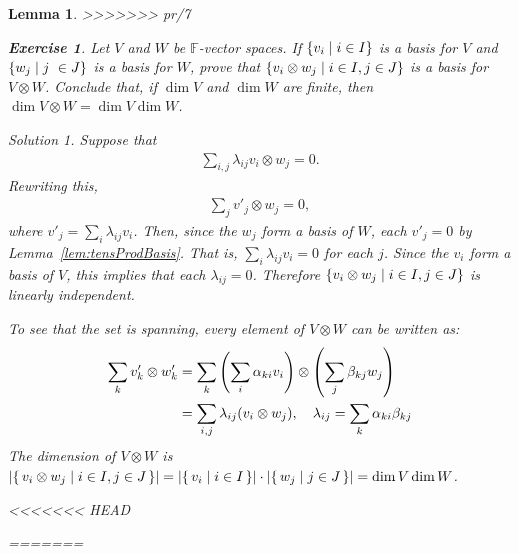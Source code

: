 \documentclass{article}
\newtheorem{Lemma}{Lemma}
\theoremstyle{definition}
\newtheorem{Exercise}{Exercise}
\theoremstyle{remark}
\newtheorem*{Solution*}{Solution}
\theoremstyle{underline}
\theoremstyle{underline}
\begin{document}
\begin{Lemma}
>>>>>>> pr/7
	\begin{Exercise}
		Let $V$ and $W$ be $\mathbb{F}$-vector spaces. If $\qty{v_i \mid i \in I}$ is a basis for $V$ and $\qty{w_j \mid j \
		\in J}$ is a basis for $W$, prove that $\qty{v_i \otimes w_j \mid i \in I, j \in J}$ is a basis for $V \otimes W$. Conclude that, if $\dim V$ and $\dim W$ are finite, then $\dim V \otimes W = \dim V \dim W$.
	\end{Exercise}
	\begin{Solution*}
		Suppose that
		\begin{gather*}
			\sum_{i,j} \lambda_{ij} v_i \otimes w_j = 0.
		\end{gather*}
		Rewriting this,
		\begin{gather*}
			\sum_j v'_j \otimes w_j = 0,
		\end{gather*}
		where $v'_j = \sum_i \lambda_{ij} v_i$. Then, since the $w_j$ form a basis of $W$, each $v'_j = 0$ by Lemma~\ref{lem:tensProdBasis}. That is, $\sum\limits_i \lambda_{ij} v_i = 0$ for each $j$. Since the $v_i$ form a basis of $V$, this implies that each $\lambda_{ij} = 0$. Therefore $\qty{v_i \otimes w_j \mid i \in I, j \in J}$ is linearly independent.
		
		To see that the set is spanning, every element of $V \otimes W$ can be written as:
		\begin{align*}
			\sum_{k} v'_k \otimes w'_k & = \sum_k \pqty{\sum_i \alpha_{ki} v_i} \otimes \pqty{\sum_j \beta_{kj} w_j} \\
				& = \sum_{i,j} \lambda_{ij} \pqty{v_i \otimes w_j}, \quad \lambda_{ij} = \sum_k \alpha_{ki} \beta_{kj}
		\end{align*}
		The dimension of $V \otimes W$ is $\abs{\qty{\, v_i \otimes w_j \mid i \in I, j \in J \,}} = \abs{\qty{\, v_i \mid i \in I \,} } \cdot \abs{\qty{\, w_j \mid j \in J \,}} = \dim V \dim W$.
	\end{Solution*}
<<<<<<< HEAD
	
=======


\end{Lemma}
\end{document}
